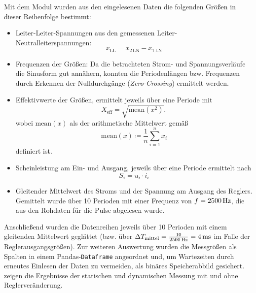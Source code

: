 Mit dem Modul wurden aus den eingelesenen Daten die folgenden Größen in dieser Reihenfolge bestimmt:
\begin{itemize}
    \item Leiter-Leiter-Spannungen aus den gemessenen Leiter-Neutralleiterspannungen: 
        \begin{equation}
        x_{\mathrm{LL}} = x_{\mathrm{2\,LN}} - x_{\mathrm{1\,LN}}
        \end{equation}
    \item Frequenzen der Größen: Da die betrachteten Strom- und Spannungsverläufe die Sinusform gut annähern, konnten die Periodenlängen bzw. Frequenzen durch Erkennen der Nulldurchgänge (\emph{Zero-Crossing}) ermittelt werden.
    \item Effektivwerte der Größen, ermittelt jeweils über eine Periode mit \begin{equation}
        X_{\mathrm{eff}}=\sqrt{\mathrm{mean}(x^2)},
    \end{equation}
    wobei $\mathrm{mean}(x)$ als der arithmetische Mittelwert gemäß \begin{equation}
        \mathrm{mean}(x) \coloneqq \frac{1}{n} \sum_{i=1}^n x_i
    \end{equation}
    definiert ist.
    \item Scheinleistung am Ein- und Ausgang, jeweils über eine Periode ermittelt nach \begin{equation}
		S_i = u_i \cdot i_i
    \end{equation}
    \item {Gleitender Mittelwert des Stroms und der Spannung am Ausgang des Reglers. Gemittelt wurde über 10 Perioden mit einer Frequenz von $f=\unit[2500]{Hz}$, die aus den Rohdaten für die Pulse abgelesen wurde.
    }
\end{itemize}
Anschließend wurden die Datenreihen jeweils über 10 Perioden mit einem gleitenden Mittelwert geglättet (bzw. über $\Delta T_{\mathrm{mittel}}=\frac{10}{\unit[2500]{Hz}}=\unit[4]{ms}$ im Falle der Reglerausgangsgrößen). Zur weiteren Auswertung wurden die Messgrößen als Spalten in einem Pandas-\texttt{Dataframe} angeordnet und, um Wartezeiten durch erneutes Einlesen der Daten zu vermeiden, als binäres Speicherabbild gesichert.  zeigen die Ergebnisse der statischen und dynamischen Messung mit und ohne Reglerveränderung.
